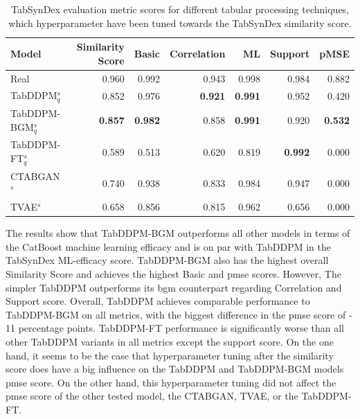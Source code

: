 \begin{table}[h]
	\centering
	\begin{tabular}{lrrrrrr}
		\toprule
		\textbf{Model}        & \textbf{Similarity Score} & \textbf{Basic} & \textbf{Correlation} & \textbf{ML}    & \textbf{Support} & \textbf{pMSE}  \\
		\midrule
		Real                  & 0.960                     & 0.992          & 0.943                & 0.998          & 0.984            & 0.882          \\
		TabDDPM$^{s}_{q}$     & 0.852                     & 0.976          & \textbf{0.921}       & \textbf{0.991} & 0.952            & 0.420          \\
		TabDDPM-BGM$^{s}_{q}$ & \textbf{0.857}            & \textbf{0.982} & 0.858                & \textbf{0.991} & 0.920            & \textbf{0.532} \\
		TabDDPM-FT$^{s}_{q}$  & 0.589                     & 0.513          & 0.620                & 0.819          & \textbf{0.992}   & 0.000          \\
		CTABGAN$^{s}$         & 0.740                     & 0.938          & 0.833                & 0.984          & 0.947            & 0.000          \\
		TVAE$^{s}$            & 0.658                     & 0.856          & 0.815                & 0.962          & 0.656            & 0.000          \\
		\bottomrule
	\end{tabular}
	\caption[Experiment2-Similarity]{TabSynDex evaluation metric scores for different tabular processing techniques, which hyperparameter have been tuned towards the TabSynDex similarity score.}
	\label{tab:exp2-sim}
\end{table}

The results show that TabDDPM-BGM outperforms all other models in terms of the CatBoost machine learning efficacy and is on par with TabDDPM in the TabSynDex ML-efficacy score.
TabDDPM-BGM also has the highest overall Similarity Score and achieves the highest Basic and \gls{pmse} scores.
However, The simpler TabDDPM outperforms its \gls{bgm} counterpart regarding Correlation and Support score.
Overall, TabDDPM achieves comparable performance to TabDDPM-BGM on all metrics, with the biggest difference in the \gls{pmse} score of - 11 percentage points.
TabDDPM-FT performance is significantly worse than all other TabDDPM variants in all metrics except the support score.
On the one hand, it seems to be the case that hyperparameter tuning after the similarity score does have a big influence on the TabDDPM and TabDDPM-BGM models \gls{pmse} score.
On the other hand, this hyperparameter tuning did not affect the \gls{pmse} score of the other tested model, the CTABGAN, TVAE, or the TabDDPM-FT.

